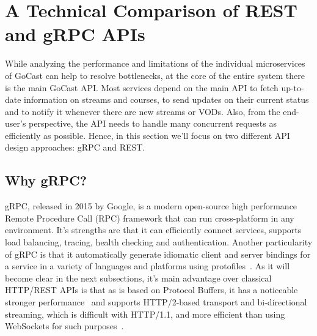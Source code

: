 


\section{A Technical Comparison of REST and gRPC APIs}

While analyzing the performance and limitations of the individual microservices of GoCast can help to resolve bottlenecks, at the core of the entire system there is the main GoCast \ac{API}.
Most services depend on the main \ac{API} to fetch up-to-date information on streams and courses, to send updates on their current status and to notify it whenever there are new streams or \ac{VOD}s. Also, from the end-user's perspective, the \ac{API} needs to handle many concurrent requests as efficiently as possible. Hence, in this section we'll focus on two different \ac{API} design approaches: gRPC and REST.

\subsection{Why gRPC?}

gRPC, released in 2015 by Google, is a modern open-source high performance Remote Procedure Call (RPC) framework that can run cross-platform in any environment. It's strengths are that it can efficiently connect services, supports load balancing, tracing, health checking and authentication.
Another particularity of gRPC is that it automatically generate idiomatic client and server bindings for a service in a variety of languages and platforms using protofiles~\parencite{grpc_vs_rest}.
As it will become clear in the next subsections, it's main advantage over classical HTTP/REST \ac{API}s is that as is based on Protocol Buffers, it has a noticeable stronger performance~\parencite{grpc_vs_rest_2} and supports HTTP/2-based transport and bi-directional streaming, which is difficult with HTTP/1.1, and more efficient than using WebSockets for such purposes~\parencite{grpc_dev}.

